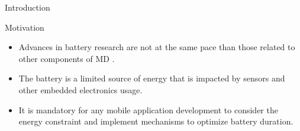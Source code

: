 \begin{frame}{Introduction}
  \begin{block}{Motivation}
    \begin{itemize}
      \item Advances in battery research are not at the same pace than those related to other components of MD \citep{Kjaergaard2012}.
      \item The battery is a limited source of energy that is impacted by sensors and other embedded electronics usage.
      \item It is mandatory for any mobile application development to consider the energy constraint and implement mechanisms to optimize battery duration.
    \end{itemize}
  \end{block}

  \begin{table}[]
  \caption{Average energy consumption of a Nokia N95 Smartphone (in \citep{Kjaergaard2012})}
\end{table}
\end{frame}

